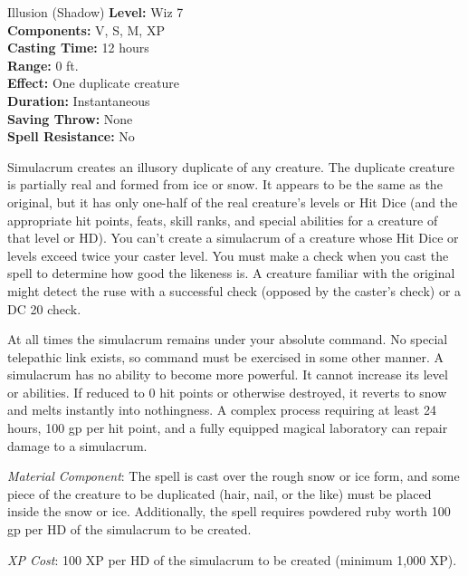{Illusion (Shadow)}
{
	\textbf{Level:}
	Wiz 7\\
	\textbf{Components:}
	V, S, M, XP\\
	\textbf{Casting Time:}
	12 hours\\
	\textbf{Range:}
	0 ft.\\
	\textbf{Effect:}
	One duplicate creature\\
	\textbf{Duration:}
	Instantaneous\\
	\textbf{Saving Throw:}
	None\\
	\textbf{Spell Resistance:}
	No\\
}
{
	Simulacrum creates an illusory duplicate of any creature. The duplicate creature is partially real and formed from ice or snow. It appears to be the same as the original, but it has only one-half of the real creature's levels or Hit Dice (and the appropriate hit points, feats, skill ranks, and special abilities for a creature of that level or HD). You can't create a simulacrum of a creature whose Hit Dice or levels exceed twice your caster level. You must make a  check when you cast the spell to determine how good the likeness is. A creature familiar with the original might detect the ruse with a successful  check (opposed by the caster's  check) or a DC 20  check.

	At all times the simulacrum remains under your absolute command. No special telepathic link exists, so command must be exercised in some other manner. A simulacrum has no ability to become more powerful. It cannot increase its level or abilities. If reduced to 0 hit points or otherwise destroyed, it reverts to snow and melts instantly into nothingness. A complex process requiring at least 24 hours, 100 gp per hit point, and a fully equipped magical laboratory can repair damage to a simulacrum.

	\textit{Material Component}:
	The spell is cast over the rough snow or ice form, and some piece of the creature to be duplicated (hair, nail, or the like) must be placed inside the snow or ice. Additionally, the spell requires powdered ruby worth 100 gp per HD of the simulacrum to be created.

	\textit{XP Cost}:
	100 XP per HD of the simulacrum to be created (minimum 1,000 XP).

}
